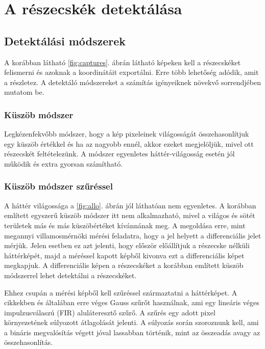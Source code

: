 \chapter{A részecskék detektálása}

\section{Detektálási módszerek}
	A korábban látható \ref{fig:captures}. ábrán látható képeken kell a részecskéket felismerni és
	azoknak a koordinátáit exportálni.
	Erre több lehetőség adódik, amit a \cite{Feng2007} részletez.
	A detektáló módszereket a számítás igényeiknek növekvő sorrendjében mutatom be.
\subsection{Küszöb módszer}
	Legkézenfekvőbb módszer, hogy a kép pixeleinek világosságát összehasonlítjuk egy küszöb értékkel
	és ha az nagyobb ennél, akkor ezeket megjelöljük, mivel ott részecskét feltételezünk. 
	A módszer egyenletes háttér-világosság esetén jól működik és extra gyorsan számítható.
\subsection{Küszöb módszer szűréssel}
	A háttér világossága a \ref{fig:allo}. ábrán jól láthatóan nem egyenletes.
	A korábban említett egyszerű küszöb módszer itt nem alkalmazható, mivel a világos és sötét
	területek más és más küszöbértéket kívánnának meg.
	A megoldása erre, mint megannyi villamosmérnöki mérési feladatra, hogy a jel helyett a
	differenciális jelet mérjük. Jelen esetben ez azt jelenti, hogy először előállítjuk a részecske
	nélküli háttérképét, majd a méréssel kapott képből kivonva ezt a differenciális képet megkapjuk.
	A differenciális képen a részecskéket a korábban említett küszöb módszerrel lehet detektálni a
	részecskéket.
	
	Ehhez csupán a mérési képből kell szűréssel származtatni a háttérképet.
	A \cite{Feng2007,Oxtoby2010} cikkekben és általában erre véges Gauss szűrőt használnak, ami egy
	lineáris véges impulzusválaszú (FIR) aluláteresztő szűrő.
	A szűrés egy adott pixel környezetének súlyozott átlagolását jelenti.
	A súlyozás során szoroznunk kell, ami a bináris megvalósítás végett jóval lassabban történik, mint az
	összeadás avagy az összehasonlítás.
	
